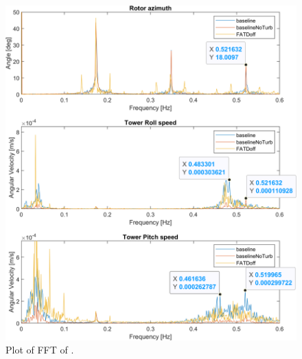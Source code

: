 \begin{figure}[h]
	\centering
	\includegraphics[width=0.8\linewidth]{Graphics/TestResults/tj01/PSIxVelyVelFFT.png}
	\caption{Plot of FFT of .}
	\label{fig:tj1_PSIxVelyVelFFT}
\end{figure}
